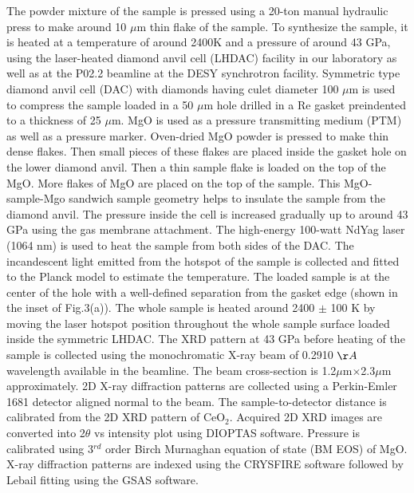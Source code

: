 \documentclass[prb,aps,preprint]{revtex4-2}
\begin{document}
The powder mixture of the sample is pressed using a 20-ton manual hydraulic press to make around 10 $\mu$m thin flake of the sample. To synthesize the sample, it is heated at a temperature of around 2400K and a pressure of around 43 GPa, using the laser-heated diamond anvil cell (LHDAC) facility in our laboratory as well as at the P02.2 beamline at the DESY synchrotron facility.
Symmetric type diamond anvil cell (DAC) with diamonds having culet diameter 100 $\mu$m is used to compress the sample loaded in a 50 $\mu$m hole drilled in a Re gasket preindented to a thickness of 25 $\mu$m. MgO is used as a pressure transmitting medium (PTM) as well as a pressure marker. Oven-dried MgO powder is pressed to make thin dense flakes. Then small pieces of these flakes are placed inside the gasket hole on the lower diamond anvil. Then a thin sample flake is loaded on the top of the MgO. More flakes of MgO are placed on the top of the sample. This MgO-sample-Mgo sandwich sample geometry helps to insulate the sample from the diamond anvil. The pressure inside the cell is increased gradually up to around 43 GPa using the gas membrane attachment. 
The high-energy 100-watt NdYag laser (1064 nm) is used to heat the sample from both sides of the DAC. The incandescent light emitted from the hotspot of the sample is collected and fitted to the Planck model to estimate the temperature. The loaded sample is at the center of the hole with a well-defined separation from the gasket edge (shown in the inset of Fig.3(a)). The whole sample is heated around 2400 $\pm$ 100 K by moving the laser hotspot position throughout the whole sample surface loaded inside the symmetric LHDAC. The XRD pattern at 43 GPa before heating of the sample is collected using the monochromatic X-ray beam of 0.2910 $\AA$ wavelength available in the beamline. The beam cross-section is 1.2$\mu$m$\times$2.3$\mu$m approximately. 2D X-ray diffraction patterns are collected using a Perkin-Emler 1681 detector aligned normal to the beam. The sample-to-detector distance is calibrated from the 2D XRD pattern of CeO$_{2}$.  Acquired 2D XRD images are converted into 2$\theta$ vs intensity plot using DIOPTAS software\cite{prescher2015dioptas}. Pressure is calibrated using 3$^{rd}$ order Birch Murnaghan equation of state (BM EOS) of MgO\cite{speziale2001quasi}. X-ray diffraction patterns are indexed using the CRYSFIRE software\cite{shirley1999crysfire} followed by Lebail fitting using the GSAS software\cite{toby2001expgui}. 
\end{document}
